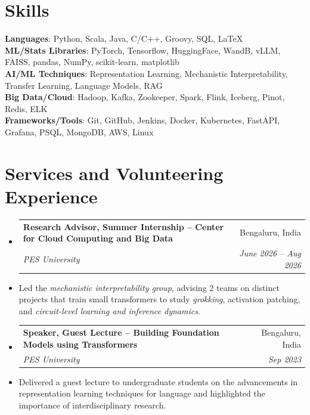 \documentclass[letterpaper, 11pt]{article}
\makeatletter
\newcommand{\resumeItem}[1]{ \item\small{ {#1 \vspace{-2pt}} } }
\newcommand{\resumeSubheading}[4]{
\vspace{-2pt}
\item
\begin{tabular*}{0.97\textwidth}[t]{l@{\extracolsep{\fill}}r}
	\textbf{#1}       & #2                 \\
	\textit{\small#3} & \textit{\small #4} \\
\end{tabular*}
\vspace{-7pt}
}
\newcommand{\resumeSubHeadingListStart}{\begin{itemize}[leftmargin=0.15in, label={}]}
\newcommand{\resumeSubHeadingListEnd}{\end{itemize}}
\makeatother
\begin{document}
	\section{Skills}
	\begin{itemize}[leftmargin=0.15in, label={}]
		\small{\item{ \textbf{Languages}{: Python, Scala, Java, C/C++, Groovy, SQL, \LaTeX} \\ \textbf{ML/Stats Libraries}{: PyTorch, Tensorflow, HuggingFace, WandB, vLLM, FAISS, pandas, NumPy, scikit-learn, matplotlib} \\ \textbf{AI/ML Techniques}{: Representation Learning, Mechanistic Interpretability, Transfer Learning, Language Models, RAG} \\ \textbf{Big Data/Cloud}{: Hadoop, Kafka, Zookeeper, Spark, Flink, Iceberg, Pinot, Redis, ELK} \\ \textbf{Frameworks/Tools}{: Git, GitHub, Jenkins, Docker, Kubernetes, FastAPI, Grafana, PSQL, MongoDB, AWS, Linux} \\ }}
	\end{itemize}

	\section{Services and Volunteering Experience}

	\resumeSubHeadingListStart

	\resumeSubheading {Research Advisor, Summer Internship -- Center for Cloud Computing and Big Data}{Bengaluru, India}
	{PES University}{June 2026 -- Aug 2026} \resumeItem{Led the \textit{mechanistic interpretability group}, advising 2 teams on distinct projects that train small transformers to study \textit{grokking}, activation patching, and \textit{circuit-level learning and inference dynamics}.}

	\resumeSubheading {Speaker, Guest Lecture -- Building Foundation Models using Transformers}{Bengaluru, India}
	{PES University}{Sep 2023} \resumeItem{Delivered a guest lecture to undergraduate students on the advancements in representation learning techniques for language and highlighted the importance of interdisciplinary research.}

	\resumeSubHeadingListEnd

\end{document}
